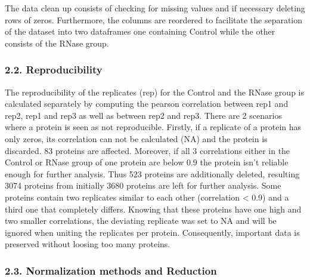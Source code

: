 \documentclass[
  12pt,
]{article}
\begin{document}
The data clean up consists of checking for missing values and if
necessary deleting rows of zeros. Furthermore, the columns are reordered
to facilitate the separation of the dataset into two dataframes one
containing Control while the other consists of the RNase group.

\hypertarget{reproducibility}{%
\subsubsection{2.2. Reproducibility}\label{reproducibility}}

\renewcommand{\section}{\titlespacing*{\section}{0pt}{0.3\baselineskip}{0.2\baselineskip}\section}

The reproducibility of the replicates (rep) for the Control and the
RNase group is calculated separately by computing the pearson
correlation between rep1 and rep2, rep1 and rep3 as well as between rep2
and rep3. There are 2 scenarios where a protein is seen as not
reproducible. Firstly, if a replicate of a protein has only zeros, its
correlation can not be calculated (NA) and the protein is discarded. 83
proteins are affected. Moreover, if all 3 correlations either in the
Control or RNase group of one protein are below 0.9 the protein isn't
reliable enough for further analysis. Thus 523 proteins are additionally
deleted, resulting 3074 proteins from initially 3680 proteins are left
for further analysis. Some proteins contain two replicates similar to
each other (correlation \textless{} 0.9) and a third one that completely
differs. Knowing that these proteins have one high and two smaller
correlations, the deviating replicate was set to NA and will be ignored
when uniting the replicates per protein. Consequently, important data is
preserved without loosing too many proteins.

\hypertarget{normalization-methods-and-reduction}{%
\subsubsection{2.3. Normalization methods and
Reduction}\label{normalization-methods-and-reduction}}
\end{document}
